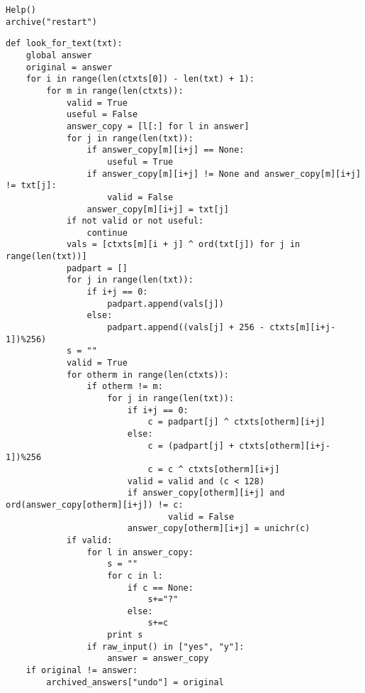 \documentclass[11pt]{article}
\begin{document}
\begin{verbatim}
Help()
archive("restart")
\end{verbatim}\newpage\begin{verbatim}
def look_for_text(txt):
    global answer
    original = answer
    for i in range(len(ctxts[0]) - len(txt) + 1):
        for m in range(len(ctxts)):
            valid = True
            useful = False
            answer_copy = [l[:] for l in answer]
            for j in range(len(txt)):
                if answer_copy[m][i+j] == None:
                    useful = True
                if answer_copy[m][i+j] != None and answer_copy[m][i+j] != txt[j]:
                    valid = False
                answer_copy[m][i+j] = txt[j]
            if not valid or not useful:
                continue
            vals = [ctxts[m][i + j] ^ ord(txt[j]) for j in range(len(txt))]
            padpart = []
            for j in range(len(txt)):
                if i+j == 0:
                    padpart.append(vals[j])
                else:
                    padpart.append((vals[j] + 256 - ctxts[m][i+j-1])%256)
            s = ""
            valid = True
            for otherm in range(len(ctxts)):
                if otherm != m:
                    for j in range(len(txt)):
                        if i+j == 0:
                            c = padpart[j] ^ ctxts[otherm][i+j]
                        else:
                            c = (padpart[j] + ctxts[otherm][i+j-1])%256
                            c = c ^ ctxts[otherm][i+j]
                        valid = valid and (c < 128)
                        if answer_copy[otherm][i+j] and ord(answer_copy[otherm][i+j]) != c:
                                valid = False
                        answer_copy[otherm][i+j] = unichr(c)
            if valid:
                for l in answer_copy:
                    s = ""
                    for c in l:
                        if c == None:
                            s+="?"
                        else:
                            s+=c
                    print s
                if raw_input() in ["yes", "y"]:
                    answer = answer_copy
    if original != answer:
        archived_answers["undo"] = original


\end{verbatim}
\end{document}

